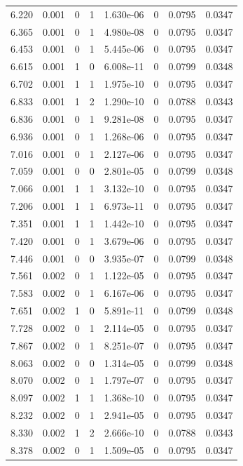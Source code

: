 \documentclass[preview]{standalone}
\begin{document}
{{{\begin{tabular}{L{1.2cm}C{1.2cm} C{0.3cm}C{0.5cm} C{1.4cm}C{1.4cm} C{1.4cm}C{1.4cm}}
  6.220  &  0.001  & 0     &  1 &  1.630e-06  & 0  & 0.0795 &  0.0347   \\ 
  6.365  &  0.001  & 0     &  1 &  4.980e-08  & 0  & 0.0795 &  0.0347   \\ 
  6.453  &  0.001  & 0     &  1 &  5.445e-06  & 0  & 0.0795 &  0.0347   \\ 
  6.615  &  0.001  & 1     &  0 &  6.008e-11  & 0  & 0.0799 &  0.0348   \\ 
  6.702  &  0.001  & 1     &  1 &  1.975e-10  & 0  & 0.0795 &  0.0347   \\ 
  6.833  &  0.001  & 1     &  2 &  1.290e-10  & 0  & 0.0788 &  0.0343   \\ 
  6.836  &  0.001  & 0     &  1 &  9.281e-08  & 0  & 0.0795 &  0.0347   \\ 
  6.936  &  0.001  & 0     &  1 &  1.268e-06  & 0  & 0.0795 &  0.0347   \\ 
  7.016  &  0.001  & 0     &  1 &  2.127e-06  & 0  & 0.0795 &  0.0347   \\ 
  7.059  &  0.001  & 0     &  0 &  2.801e-05  & 0  & 0.0799 &  0.0348   \\ 
  7.066  &  0.001  & 1     &  1 &  3.132e-10  & 0  & 0.0795 &  0.0347   \\ 
  7.206  &  0.001  & 1     &  1 &  6.973e-11  & 0  & 0.0795 &  0.0347   \\ 
  7.351  &  0.001  & 1     &  1 &  1.442e-10  & 0  & 0.0795 &  0.0347   \\ 
  7.420  &  0.001  & 0     &  1 &  3.679e-06  & 0  & 0.0795 &  0.0347   \\ 
  7.446  &  0.001  & 0     &  0 &  3.935e-07  & 0  & 0.0799 &  0.0348   \\ 
  7.561  &  0.002  & 0     &  1 &  1.122e-05  & 0  & 0.0795 &  0.0347   \\ 
  7.583  &  0.002  & 0     &  1 &  6.167e-06  & 0  & 0.0795 &  0.0347   \\ 
  7.651  &  0.002  & 1     &  0 &  5.891e-11  & 0  & 0.0799 &  0.0348   \\ 
  7.728  &  0.002  & 0     &  1 &  2.114e-05  & 0  & 0.0795 &  0.0347   \\ 
  7.867  &  0.002  & 0     &  1 &  8.251e-07  & 0  & 0.0795 &  0.0347   \\ 
  8.063  &  0.002  & 0     &  0 &  1.314e-05  & 0  & 0.0799 &  0.0348   \\ 
  8.070  &  0.002  & 0     &  1 &  1.797e-07  & 0  & 0.0795 &  0.0347   \\ 
  8.097  &  0.002  & 1     &  1 &  1.368e-10  & 0  & 0.0795 &  0.0347   \\ 
  8.232  &  0.002  & 0     &  1 &  2.941e-05  & 0  & 0.0795 &  0.0347   \\ 
  8.330  &  0.002  & 1     &  2 &  2.666e-10  & 0  & 0.0788 &  0.0343   \\ 
  8.378  &  0.002  & 0     &  1 &  1.509e-05  & 0  & 0.0795 &  0.0347   \\ 
\hline 
\end{tabular} 

}}}
\end{document}
